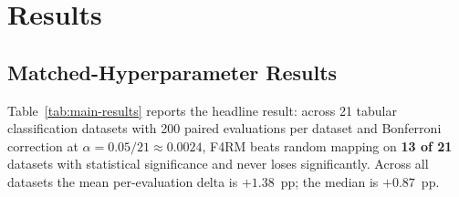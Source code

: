 \section{Results}
\label{sec:results}

\subsection{Matched-Hyperparameter Results}
\label{sec:results-matched}

Table~\ref{tab:main-results} reports the headline result: across 21 tabular classification datasets with 200 paired evaluations per dataset and Bonferroni correction at $\alpha = 0.05/21 \approx 0.0024$, F4RM beats random mapping on \textbf{13 of 21} datasets with statistical significance and never loses significantly. Across all datasets the mean per-evaluation delta is $+1.38$~pp; the median is $+0.87$~pp.

